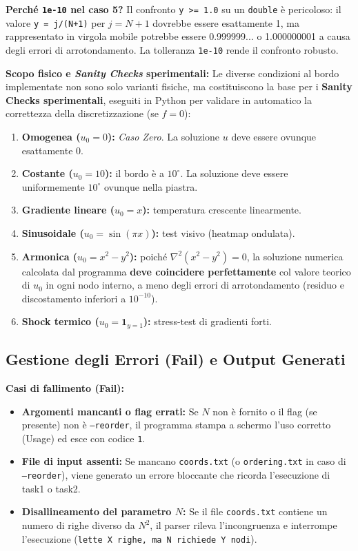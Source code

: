 \documentclass[a4paper,11pt]{article}
\theoremstyle{definition}
\begin{document}
\textbf{Perché \texttt{1e-10} nel caso 5?} Il confronto \texttt{y >= 1.0} su un \texttt{double} è pericoloso: il valore \texttt{y = j/(N+1)} per $j = N+1$ dovrebbe essere esattamente 1, ma rappresentato in virgola mobile potrebbe essere 0.999999... o 1.000000001 a causa degli errori di arrotondamento. La tolleranza \texttt{1e-10} rende il confronto robusto.

\textbf{Scopo fisico e \textit{Sanity Checks} sperimentali:}
Le diverse condizioni al bordo implementate non sono solo varianti fisiche, ma costituiscono la base per i \textbf{Sanity Checks sperimentali}, eseguiti in Python per validare in automatico la correttezza della discretizzazione (se $f=0$):
\begin{enumerate}
  \item \textbf{Omogenea ($u_0=0$):} \textit{Caso Zero}. La soluzione $u$ deve essere ovunque esattamente $0$.
  \item \textbf{Costante ($u_0=10$):} il bordo è a $10^\circ$. La soluzione deve essere uniformemente $10^\circ$ ovunque nella piastra.
  \item \textbf{Gradiente lineare ($u_0=x$):} temperatura crescente linearmente.
  \item \textbf{Sinusoidale ($u_0=\sin(\pi x)$):} test visivo (heatmap ondulata).
  \item \textbf{Armonica ($u_0=x^2-y^2$):} poiché $\nabla^2(x^2-y^2) = 0$, la soluzione numerica calcolata dal programma \textbf{deve coincidere perfettamente} col valore teorico di $u_0$ in ogni nodo interno, a meno degli errori di arrotondamento (residuo e discostamento inferiori a $10^{-10}$).
  \item \textbf{Shock termico ($u_0 = \mathbf{1}_{y=1}$):} stress-test di gradienti forti.
\end{enumerate}

\subsection{Gestione degli Errori (Fail) e Output Generati}
\textbf{Casi di fallimento (Fail):}
\begin{itemize}
  \item \textbf{Argomenti mancanti o flag errati:} Se $N$ non è fornito o il flag (se presente) non è \texttt{--reorder}, il programma stampa a schermo l'uso corretto (Usage) ed esce con codice \texttt{1}.
  \item \textbf{File di input assenti:} Se mancano \texttt{coords.txt} (o \texttt{ordering.txt} in caso di \texttt{--reorder}), viene generato un errore bloccante che ricorda l'esecuzione di task1 o task2.
  \item \textbf{Disallineamento del parametro $N$:} Se il file \texttt{coords.txt} contiene un numero di righe diverso da $N^2$, il parser rileva l'incongruenza e interrompe l'esecuzione (\texttt{lette X righe, ma N richiede Y nodi}).
\end{itemize}
\end{document}
